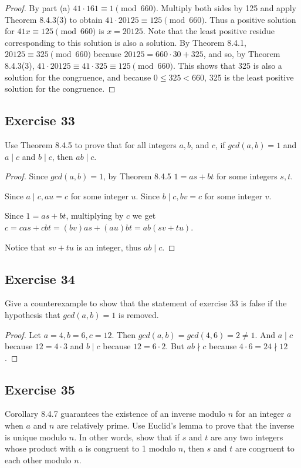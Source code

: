 \documentclass[14pt]{extarticle}
\begin{document}
\begin{proof}
        By part (a) \(41 \cdot 161 \equiv 1 \pmod{660}\). Multiply both sides by 125 and apply Theorem 8.4.3(3) to obtain
        \(41 \cdot 20125 \equiv 125 \pmod{660}\). Thus a positive solution for \(41x \equiv 125 \pmod{660}\) is
        \(x = 20125\). Note that the least positive residue corresponding to this solution is also a solution. By
        Theorem 8.4.1, \(20125 \equiv 325 \pmod{660}\) because \(20125 = 660 \cdot 30 + 325\), and so, by Theorem
        8.4.3(3), \(41 \cdot 20125 \equiv 41 \cdot 325 \equiv 125 \pmod{660}\). This shows that 325 is also a solution for
        the congruence, and because \(0 \leq 325 < 660\), 325 is the least positive solution for the congruence.
\end{proof}

\subsection{Exercise 33}
Use Theorem 8.4.5 to prove that for all integers \(a, b\), and $c$, if \(gcd(a, b) = 1\) and \(a \mid c\) and \(b \mid
c\), then \(ab \mid c\).

\begin{proof}
        Since \(gcd(a,b) = 1\), by Theorem 8.4.5 \(1 = as+bt\) for some integers \(s,t\).

        Since \(a \mid c, au = c\) for some integer $u$. Since \(b \mid c, bv = c\) for some integer $v$.

        Since \(1 = as+bt\), multiplying by $c$ we get \(c = cas + cbt = (bv)as + (au)bt = ab(sv + tu)\).

        Notice that \(sv+tu\) is an integer, thus \(ab \mid c\).
\end{proof}

\subsection{Exercise 34}
Give a counterexample to show that the statement of exercise 33 is false if the hypothesis that \(gcd(a, b)=1\)
is removed.

\begin{proof}
        Let \(a = 4, b = 6, c = 12\). Then \(gcd(a,b) = gcd(4,6) = 2 \neq 1\). And \(a \mid c\) because \(12 = 4 \cdot 3\) and
        \(b \mid c\) because \(12 = 6 \cdot 2\). But \(ab \nmid c\) because \(4 \cdot 6 = 24 \nmid 12\).
\end{proof}

\subsection{Exercise 35}
Corollary 8.4.7 guarantees the existence of an inverse modulo $n$ for an integer $a$ when $a$ and $n$ are
relatively prime. Use Euclid’s lemma to prove that the inverse is unique modulo $n$. In other words, show that if
$s$ and $t$ are any two integers whose product with $a$ is congruent to 1 modulo $n$, then $s$ and $t$ are congruent
to each other modulo $n$.
\end{document}
